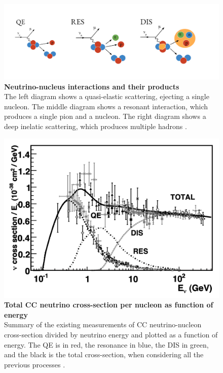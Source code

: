 \begin{figure}[h!]
	\begin{center}
		\includegraphics[scale=0.15]{Figures/neutrino_int_processes.jpeg}
		\caption[Neutrino-nucleus interactions and their products]{ {\textbf{Neutrino-nucleus interactions and their products}} \\ The left diagram shows a quasi-elastic scattering, ejecting a single nucleon. The middle diagram shows a resonant interaction, which produces a single pion and a nucleon. The right diagram shows a deep inelatic scattering, which produces multiple hadrons \cite{afro_phd}.}
		\label{nu_nucleus_int}	
	\end{center}
\end{figure}

\begin{figure}[h!]
	\begin{center}
		\includegraphics[scale=0.35]{Figures/nu_scatter.jpeg}
		\caption[Total CC neutrino cross-section per nucleon as function of energy]{ {\textbf{Total CC neutrino cross-section per nucleon as function of energy}} \\ Summary of the existing measurements of CC neutrino-nucleon cross-section divided by neutrino energy and plotted as a function of energy. The QE is in red, the resonance in blue, the DIS in green, and the black is the total cross-section, when considering all the previous processes \cite{nu_scatter_zeller}.}
		\label{nu_scatter}	
	\end{center}
\end{figure}


